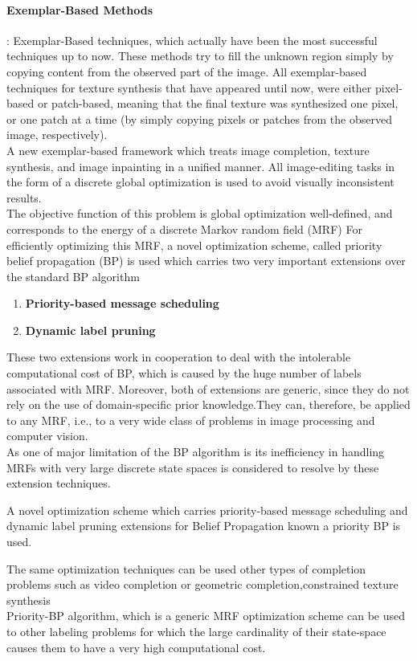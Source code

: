 \paragraph{Exemplar-Based Methods} : Exemplar-Based techniques, which actually have been the most successful techniques up to now. These methods try to fill the unknown region simply
by copying content from the observed part of the image. All exemplar-based techniques for texture synthesis
that have appeared until now, were either pixel-based or patch-based, meaning that the final texture
was synthesized one pixel, or one patch at a time (by simply copying pixels or patches from the observed image, respectively).
\\ A new exemplar-based framework  which treats image completion, texture synthesis, and image inpainting in a unified manner. All   image-editing tasks in the form of a discrete global optimization is used to avoid visually inconsistent results.
\\ The objective function of this problem is global optimization well-defined, and corresponds to the energy of a discrete Markov random field (MRF)
For efficiently optimizing this MRF, a novel optimization scheme, called priority belief propagation (BP) is used  which carries two very important extensions over the standard BP algorithm

  \begin{enumerate}
  \item \textbf{Priority-based message scheduling}
  \item \textbf{Dynamic label pruning}
\end{enumerate}

These two extensions work in cooperation to deal with the intolerable computational cost of BP, which is caused by the huge number of labels associated with  MRF. Moreover, both of  extensions are generic, since they do not rely on the use of domain-specific prior knowledge.They can, therefore, be applied to any MRF, i.e., to a very wide class of problems in image processing and computer vision.\\As one of  major limitation of the BP algorithm  is  its inefficiency in handling MRFs with very large discrete state spaces is considered to resolve by these extension techniques.

A novel optimization scheme which carries priority-based message scheduling and dynamic label pruning extensions for Belief Propagation known a priority BP is used.

The same optimization techniques can be used other types of completion problems such as video completion or geometric completion,constrained texture synthesis
\\ Priority-BP algorithm, which is a generic MRF optimization scheme can be used to other labeling problems  for which the large cardinality of their state-space causes them
to have a very high computational cost.



